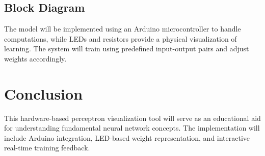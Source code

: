 \documentclass{article}
\begin{document}
\subsection{Block Diagram}
\begin{center}
\end{center}

The model will be implemented using an Arduino microcontroller to handle computations, while LEDs and resistors provide a physical visualization of learning. The system will train using predefined input-output pairs and adjust weights accordingly. 

\section{Conclusion}
This hardware-based perceptron visualization tool will serve as an educational aid for understanding fundamental neural network concepts. The implementation will include Arduino integration, LED-based weight representation, and interactive real-time training feedback.
\end{document}
